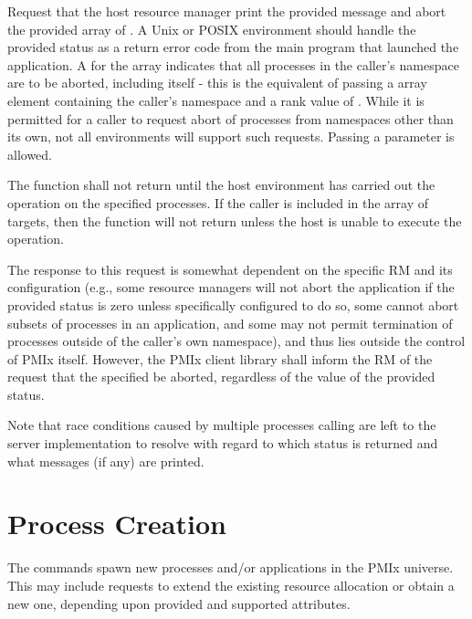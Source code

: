 \descr

Request that the host resource manager print the provided message and abort the provided array of .
A Unix or POSIX environment should handle the provided status as a return error code from the main program that launched the application.
A  for the  array indicates that all processes in the caller's namespace are to be aborted, including itself - this is the equivalent of passing a  array element containing the caller's namespace and a rank value of . While it is permitted for a caller to request abort of processes from namespaces other than its own, not all environments will support such requests.
Passing a   parameter is allowed.

The function shall not return until the host environment has carried out the operation on the specified processes. If the caller is included in the array of targets, then the function will not return unless the host is unable to execute the operation.

\adviceuserstart
The response to this request is somewhat dependent on the specific \ac{RM} and its configuration (e.g., some resource managers will not abort the application if the provided status is zero unless specifically configured to do so, some cannot abort subsets of processes in an application, and some may not permit termination of processes outside of the caller's own namespace), and thus lies outside the control of PMIx itself.
However, the PMIx client library shall inform the \ac{RM} of the request that the specified  be aborted, regardless of the value of the provided status.

Note that race conditions caused by multiple processes calling  are left to the server implementation to resolve with regard to which status is returned and what messages (if any) are printed.
\adviceuserend


\section{Process Creation}
\label{chap:api_proc_mgmt:spawn}

The  commands spawn new processes and/or applications in the \ac{PMIx} universe. This may include requests to extend the existing resource allocation or obtain a new one, depending upon provided and supported attributes.


